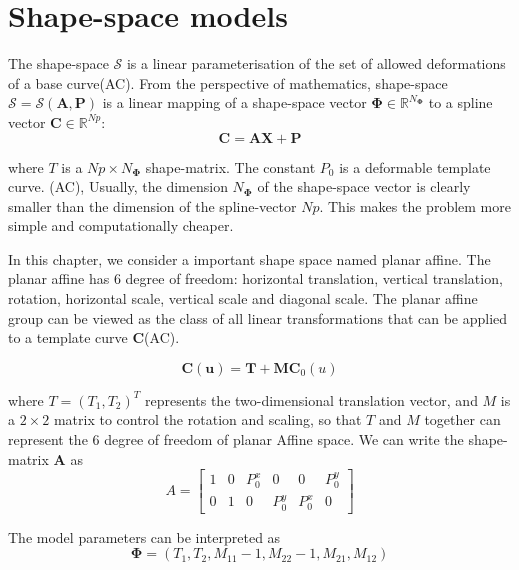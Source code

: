 \section{Shape-space models}
\label{sec:ssm}

The shape-space $\mathcal{S}$ is a linear parameterisation of the set of allowed
deformations of a base curve(AC). From the perspective of mathematics, shape-space
$\mathcal{S} = \mathcal{S}(\mathbf{A},\mathbf{P})$ is a linear mapping of a shape-space
vector $\mathbf{\Phi} \in  \mathbb{R}^{N_{\mathbf{\Phi}}}$ to a spline vector $\mathbf{C} \in
\mathbb{R}^{Np}$:
\begin{equation}
  \label{eq:4.16}
  \mathbf{C} = \mathbf{A}\mathbf{X}+ \mathbf{P}
\end{equation}

where $T$ is a $Np \times N_{\mathbf{\Phi}}$ shape-matrix. The
constant  $P_0$ is a deformable template curve. (AC), Usually, the
dimension $N_{\mathbf{\Phi}}$ of the shape-space vector is clearly
smaller than the dimension of the spline-vector $Np$. This makes the
problem more simple and computationally cheaper.

In this chapter, we consider a important shape space named planar
affine. The planar affine has 6 degree of freedom: horizontal
translation, vertical translation, rotation, horizontal scale,
vertical scale and diagonal scale. The planar affine group can be
viewed as the class of all linear transformations that can be applied
to a template curve $\mathbf{C}$(AC). 

\begin{equation}
  \label{eq:4.17}
  \mathbf{C(u)} = \mathbf{T} + \mathbf{M} \mathbf{C}_0(u)
\end{equation}

where $T = (T_1, T_2)^T$ represents the two-dimensional translation
vector, and $M$ is a $2 \times 2$ matrix to control the rotation and
scaling, so that $T$ and $M$ together can represent the 6 degree of
freedom of planar Affine space. We can write the shape-matrix $\mathbf{A}$
as 
\begin{equation}
  \label{eq:4.18}
  A =
  \begin{bmatrix}
    1 & 0 & P_0^x & 0 & 0 & P_0^y\\
    0 & 1 & 0 & P_0^y & P_0^x & 0
  \end{bmatrix}
\end{equation}

The model parameters can be interpreted as
\begin{equation}
  \label{eq:4.19}
  \mathbf{\Phi} =  (T_1, T_2, M_{11} - 1, M_{22} - 1, M_{21}, M_{12})
\end{equation}

